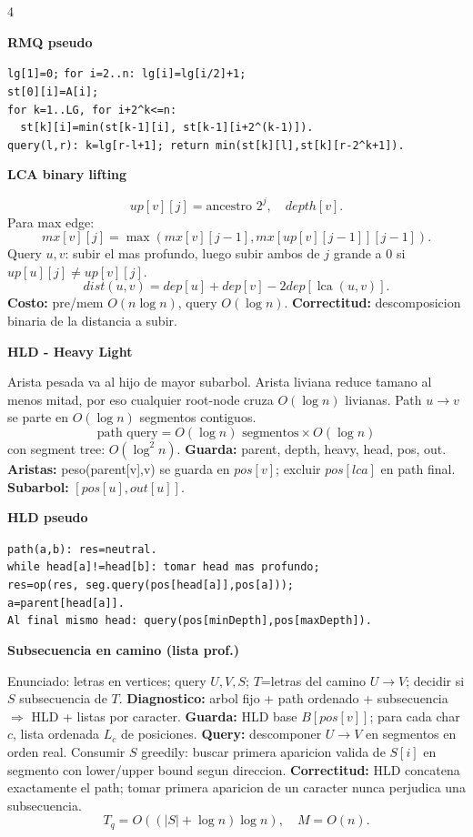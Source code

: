 \documentclass[8pt]{extarticle}
\newcommand{\blk}[2]{%
  \vspace{1.3pt}
  \noindent\colorbox{head}{\parbox{\linewidth-2\fboxsep}{\textbf{#1}}}\par
  {\footnotesize #2}\par
}
\newcommand{\bigO}{O}
\newcommand{\lca}{\operatorname{lca}}
\begin{document}
\begin{multicols}{4}
\blk{RMQ pseudo}{
\texttt{lg[1]=0;} \texttt{for i=2..n: lg[i]=lg[i/2]+1;} \\
\texttt{st[0][i]=A[i];} \\
\texttt{for k=1..LG, for i+2\string^k<=n:}\\
\texttt{\ \ st[k][i]=min(st[k-1][i], st[k-1][i+2\string^(k-1)]).}\\
\texttt{query(l,r): k=lg[r-l+1]; return min(st[k][l],st[k][r-2\string^k+1]).}}

\blk{LCA binary lifting}{
\[
up[v][j]=\text{ancestro }2^j,\quad depth[v].
\]
Para max edge:
\[
mx[v][j]=\max(mx[v][j-1],mx[up[v][j-1]][j-1]).
\]
Query \(u,v\): subir el mas profundo, luego subir ambos de \(j\) grande a 0 si \(up[u][j]\ne up[v][j]\). 
\[
dist(u,v)=dep[u]+dep[v]-2dep[\lca(u,v)].
\]
\textbf{Costo:} pre/mem \(\bigO(n\log n)\), query \(\bigO(\log n)\).
\textbf{Correctitud:} descomposicion binaria de la distancia a subir.}

\blk{HLD - Heavy Light}{
Arista pesada va al hijo de mayor subarbol. Arista liviana reduce tamano al menos mitad, por eso cualquier root-node cruza \(\bigO(\log n)\) livianas. Path \(u\to v\) se parte en \(\bigO(\log n)\) segmentos contiguos.
\[
\text{path query}=\bigO(\log n)\text{ segmentos}\times\bigO(\log n)
\]
con segment tree: \(\bigO(\log^2 n)\).
\textbf{Guarda:} parent, depth, heavy, head, pos, out.
\textbf{Aristas:} peso(parent[v],v) se guarda en \(pos[v]\); excluir \(pos[lca]\) en path final.
\textbf{Subarbol:} \([pos[u],out[u]]\).}

\blk{HLD pseudo}{
\texttt{path(a,b): res=neutral.}\\
\texttt{while head[a]!=head[b]: tomar head mas profundo;}\\
\texttt{res=op(res, seg.query(pos[head[a]],pos[a]));}\\
\texttt{a=parent[head[a]].}\\
\texttt{Al final mismo head: query(pos[minDepth],pos[maxDepth]).}}

\blk{Subsecuencia en camino (lista prof.)}{
Enunciado: letras en vertices; query \(U,V,S\); \(T\)=letras del camino \(U\to V\); decidir si \(S\) subsecuencia de \(T\).
\textbf{Diagnostico:} arbol fijo + path ordenado + subsecuencia \(\Rightarrow\) HLD + listas por caracter.
\textbf{Guarda:} HLD base \(B[pos[v]]\); para cada char \(c\), lista ordenada \(L_c\) de posiciones.
\textbf{Query:} descomponer \(U\to V\) en segmentos en orden real. Consumir \(S\) greedily: buscar primera aparicion valida de \(S[i]\) en segmento con lower/upper bound segun direccion.
\textbf{Correctitud:} HLD concatena exactamente el path; tomar primera aparicion de un caracter nunca perjudica una subsecuencia.
\[
T_q=\bigO((|S|+\log n)\log n),\quad M=\bigO(n).
\]}


\end{multicols}
\end{document}
